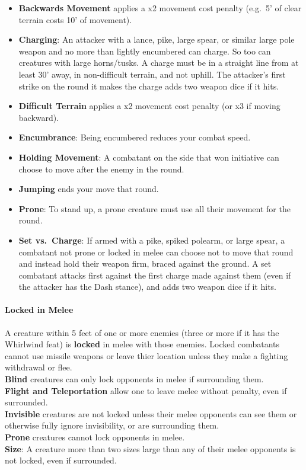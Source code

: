 \documentclass{article}
\begin{document}
\begin{multicols}{2}
\begin{itemize}
\tightlist
\item
  \textbf{Backwards Movement} applies a x2 movement cost penalty
  (e.g.~5' of clear terrain costs 10' of movement).
\item
  \textbf{Charging}: An attacker with a lance, pike, large spear, or
  similar large pole weapon and no more than lightly encumbered can
  charge. So too can creatures with large horns/tusks. A charge must be
  in a straight line from at least 30' away, in non-difficult terrain,
  and not uphill. The attacker's first strike on the round it makes the
  charge adds two weapon dice if it hits.
\item
  \textbf{Difficult Terrain} applies a x2 movement cost penalty (or x3
  if moving backward).
\item
  \textbf{Encumbrance}: Being encumbered reduces your combat speed.
\item
  \textbf{Holding Movement}: A combatant on the side that won initiative
  can choose to move after the enemy in the round.
\item
  \textbf{Jumping} ends your move that round.
\item
  \textbf{Prone}: To stand up, a prone creature must use all their
  movement for the round.
\item
  \textbf{Set vs.~Charge}: If armed with a pike, spiked polearm, or
  large spear, a combatant not prone or locked in melee can choose not
  to move that round and instead hold their weapon firm, braced against
  the ground. A set combatant attacks first against the first charge
  made against them (even if the attacker has the Dash stance), and adds
  two weapon dice if it hits.
\end{itemize}

\paragraph{Locked in Melee}\label{locked-in-melee}

A creature within 5 feet of one or more enemies (three or more if it has
the Whirlwind feat) is \textbf{locked} in melee with those enemies.
Locked combatants cannot use missile weapons or leave thier location
unless they make a fighting withdrawal or flee.\\
\textbf{Blind} creatures can only lock opponents in melee if surrounding
them.\\
\textbf{Flight and Teleportation} allow one to leave melee without
penalty, even if surrounded.\\
\textbf{Invisible} creatures are not locked unless their melee opponents
can see them or otherwise fully ignore invisibility, or are surrounding
them.\\
\textbf{Prone} creatures cannot lock opponents in melee.\\
\textbf{Size}: A creature more than two sizes large than any of their
melee opponents is not locked, even if surrounded.


\end{multicols}
\end{document}

